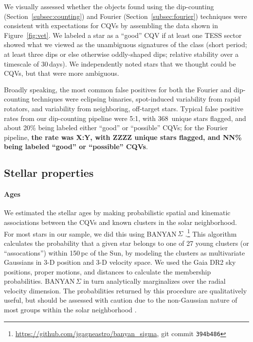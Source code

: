 \documentclass[11pt,twocolumn,tighten]{aastex63}
\newcommand{\nuniqdipflagged}{{368}} %
\begin{document}
We visually assessed whether the objects found using the dip-counting
(Section~\ref{subsec:counting}) and Fourier
(Section~\ref{subsec:fourier}) techniques were consistent with
expectations for CQVs by assembling the data shown in
Figure~\ref{fig:vet}.  We labeled a star as a ``good'' CQV if at least
one TESS sector showed what we viewed as the unambiguous signatures of
the class (short period; at least three dips or else otherwise
oddly-shaped dips; relative stability over a timescale of 30\,days).
We independently noted stars that we thought could be CQVs, but that were more
ambiguous.

Broadly speaking, the most common false positives for both the Fourier
and dip-counting techniques were eclipsing binaries, spot-induced
variability from rapid rotators, and variability from neighboring,
off-target stars.  Typical false positive rates from our dip-counting
pipeline were 5:1, with \nuniqdipflagged\ unique stars flagged, and
about 20\% being labeled either ``good'' or ``possible'' CQVs; for
the Fourier pipeline, {\bf the rate was X:Y, with ZZZZ unique stars
flagged, and NN\% being labeled ``good'' or ``possible'' CQVs}.


\subsection{Stellar properties}
\label{subsec:starprops}

\paragraph{Ages}
We estimated the stellar ages by making probabilistic spatial and
kinematic associations between the CQVs and known clusters in the
solar neighborhood.  For most stars in our sample, we did this using
BANYAN\,$\Sigma$
\citep{2018ApJ...856...23G}.\footnote{\url{https://github.com/jgagneastro/banyan_sigma},
git commit \texttt{394b486}} This algorithm calculates the probability
that a given star belongs to one of 27 young clusters (or
``assocations'') within 150\,pc of the Sun, by modeling the clusters
as multivariate Gaussians in 3-D position and 3-D velocity space.  We
used the Gaia DR2 sky positions, proper motions, and distances to
calculate the membership probabilities.  BANYAN\,$\Sigma$ in turn
analytically marginalizes over the radial velocity dimension.  The
probabilities returned by this procedure are qualitatively useful, but
should be assessed with caution due to the
non-Gaussian nature of most groups within the solar neighborhood
\citep[see e.g.][Figure~10]{2021ApJ...917...23K}.
\end{document}
